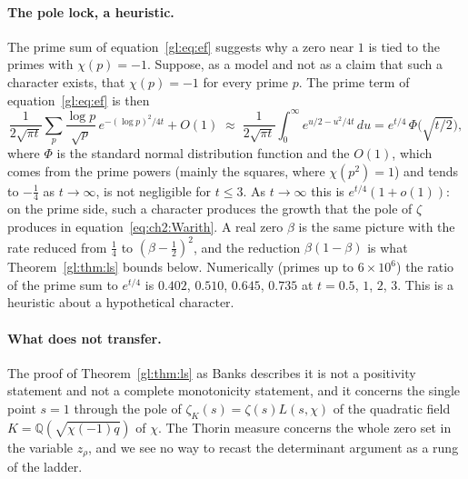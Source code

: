\paragraph{The pole lock, a heuristic.} The prime sum of equation~\eqref{gl:eq:ef} suggests why a zero near $1$ is tied to the primes with $\chi(p)=-1$. Suppose, as a model and not as a claim that such a character exists, that $\chi(p)=-1$ for every prime $p$. The prime term of equation~\eqref{gl:eq:ef} is then
\[
\frac1{2\sqrt{\pi t}}\sum_p\frac{\log p}{\sqrt p}\,e^{-(\log p)^2/4t}+O(1)\;\approx\;\frac1{2\sqrt{\pi t}}\int_0^\infty e^{u/2-u^2/4t}\,du=e^{t/4}\,\Phi\big(\sqrt{t/2}\big),
\]
where $\Phi$ is the standard normal distribution function and the $O(1)$, which comes from the prime powers (mainly the squares, where $\chi(p^2)=1$) and tends to $-\tfrac14$ as $t\to\infty$, is not negligible for $t\le3$. As $t\to\infty$ this is $e^{t/4}(1+o(1))$: on the prime side, such a character produces the growth that the pole of $\zeta$ produces in equation~\eqref{eq:ch2:Warith}. A real zero $\beta$ is the same picture with the rate reduced from $\tfrac14$ to $(\beta-\tfrac12)^2$, and the reduction $\beta(1-\beta)$ is what Theorem~\ref{gl:thm:ls} bounds below. Numerically (primes up to $6\times10^6$) the ratio of the prime sum to $e^{t/4}$ is $0.402$, $0.510$, $0.645$, $0.735$ at $t=0.5$, $1$, $2$, $3$.
This is a heuristic about a hypothetical character.

\paragraph{What does not transfer.} The proof of Theorem~\ref{gl:thm:ls} as Banks describes it is not a positivity statement and not a complete monotonicity statement, and it concerns the single point $s=1$ through the pole of $\zeta_K(s)=\zeta(s)L(s,\chi)$ of the quadratic field $K=\mathbb Q(\sqrt{\chi(-1)q})$ of $\chi$. The Thorin measure concerns the whole zero set in the variable $z_\rho$, and we see no way to recast the determinant argument as a rung of the ladder.
